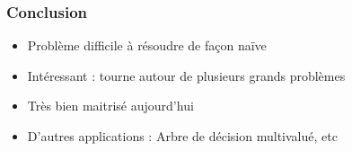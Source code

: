 \documentclass[handout]{beamer}
\begin{document}
\begin{frame}
  \frametitle{Conclusion}

  \begin{itemize}
  \item Problème difficile à résoudre de façon naïve
  \item Intéressant : tourne autour de plusieurs grands problèmes
  \item Très bien maitrisé aujourd'hui
  \item D'autres applications : Arbre de décision multivalué, etc
  \end{itemize}

\end{frame}
\end{document}
